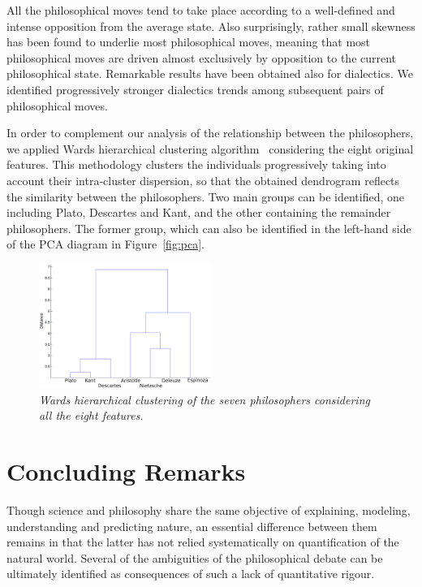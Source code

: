 \documentclass[%
 aip,
 jmp,%
 amsmath,amssymb,
 reprint,%
]{revtex4-1}
\begin{document}
All the philosophical moves tend to take place according to a
well-defined and intense opposition from the average state.  Also
surprisingly, rather small skewness has been found to underlie most
philosophical moves, meaning that most philosophical moves are driven
almost exclusively by opposition to the current philosophical state.
Remarkable results have been obtained also for dialectics.  We
identified progressively stronger dialectics trends among subsequent
pairs of philosophical moves.

In order to complement our analysis of the relationship between the
philosophers, we applied Wards hierarchical clustering
algorithm~\cite{Duda,Costa} considering the eight original features.
This methodology clusters the individuals progressively taking into
account their intra-cluster dispersion, so that the obtained
dendrogram reflects the similarity between the philosophers.  Two main
groups can be identified, one including Plato, Descartes and Kant, and
the other containing the remainder philosophers.  The former group,
which can also be identified in the left-hand side of the PCA diagram
in Figure~\ref{fig:pca}.

\begin{figure}
        \begin{center}
                \includegraphics[width=0.5\textwidth]{Dendrogram_.eps}
        \end{center}
        \caption{\it Wards  hierarchical clustering of the seven
                    philosophers considering all the eight features.}
        \label{fig.hier}
\end{figure}



\section{Concluding Remarks}

Though science and philosophy share the same objective of explaining,
modeling, understanding and predicting nature, an essential difference
between them remains in that the latter has not relied systematically
on quantification of the natural world.  Several of the ambiguities of
the philosophical debate can be ultimately identified as consequences
of such a lack of quantitative rigour.
\end{document}
